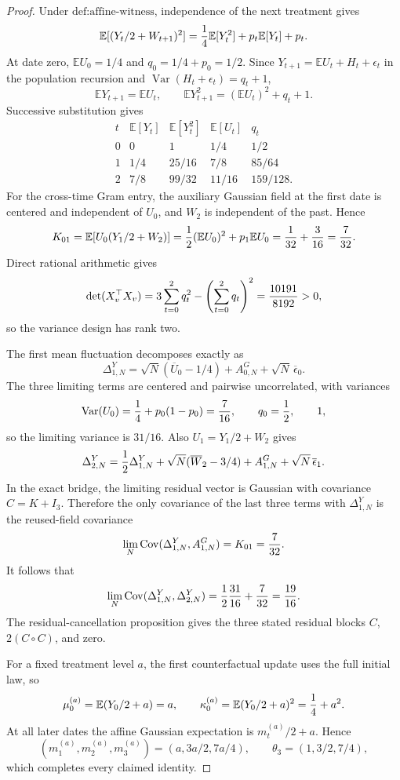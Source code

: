 \documentclass{article}
\begin{document}
\begin{proof}
Under \(\text{def:affine-witness}\), independence of the next treatment gives
\[
 \mathbb E[(Y_t/2+W_{t+1})^2]={1\over4}\mathbb E[Y_t^2]+p_t\mathbb E[Y_t]+p_t.
\]
At date zero, \(\mathbb E U_0=1/4\) and \(q_0=1/4+p_0=1/2\).  Since \(Y_{t+1}=\mathbb E U_t+H_t+\epsilon_t\) in the population recursion and \(\operatorname{Var}(H_t+\epsilon_t)=q_t+1\),
\[
 \mathbb E Y_{t+1}=\mathbb E U_t,
 \qquad \mathbb E Y_{t+1}^2=(\mathbb E U_t)^2+q_t+1.
\]
Successive substitution gives
\[
 \begin{array}{c|c|c|c|c}
 t&\mathbb E[Y_t]&\mathbb E[Y_t^2]&\mathbb E[U_t]&q_t\\\hline
 0&0&1&1/4&1/2\\
 1&1/4&25/16&7/8&85/64\\
 2&7/8&99/32&11/16&159/128.
 \end{array}
\]
For the cross-time Gram entry, the auxiliary Gaussian field at the first date is centered and independent of \(U_0\), and \(W_2\) is independent of the past.  Hence
\[
 K_{01}=\mathbb E[U_0(Y_1/2+W_2)]
 ={1\over2}(\mathbb E U_0)^2+p_1\mathbb E U_0
 ={1\over32}+{3\over16}={7\over32}.
\]
Direct rational arithmetic gives
\[
 \det(X_v^{\top}X_v)=3\sum_{t=0}^2q_t^2-\left(\sum_{t=0}^2q_t\right)^2={10191\over8192}>0,
\]
so the variance design has rank two.

The first mean fluctuation decomposes exactly as
\[
 \Delta_{1,N}^{Y}=\sqrt N(\overline U_0-1/4)+A_{0,N}^{G}+\sqrt N\,\overline\epsilon_0.
\]
The three limiting terms are centered and pairwise uncorrelated, with variances
\[
 \operatorname{Var}(U_0)={1\over4}+p_0(1-p_0)={7\over16},
 \qquad q_0={1\over2},
 \qquad1,
\]
so the limiting variance is \(31/16\).  Also \(U_1=Y_1/2+W_2\) gives
\[
 \Delta_{2,N}^{Y}={1\over2}\Delta_{1,N}^{Y}
 +\sqrt N(\overline W_2-3/4)+A_{1,N}^{G}+\sqrt N\,\overline\epsilon_1.
\]
In the exact bridge, the limiting residual vector is Gaussian with covariance \(C=K+I_3\).  Therefore the only covariance of the last three terms with \(\Delta_{1,N}^{Y}\) is the reused-field covariance
\[
 \lim_N\operatorname{Cov}(\Delta_{1,N}^{Y},A_{1,N}^{G})=K_{01}={7\over32}.
\]
It follows that
\[
 \lim_N\operatorname{Cov}(\Delta_{1,N}^{Y},\Delta_{2,N}^{Y})
 ={1\over2}{31\over16}+{7\over32}={19\over16}.
\]
The residual-cancellation proposition gives the three stated residual blocks \(C\), \(2(C\circ C)\), and zero.

For a fixed treatment level \(a\), the first counterfactual update uses the full initial law, so
\[
 \mu_0^{(a)}=\mathbb E(Y_0/2+a)=a,
 \qquad \kappa_0^{(a)}=\mathbb E(Y_0/2+a)^2={1\over4}+a^2.
\]
At all later dates the affine Gaussian expectation is \(m_t^{(a)}/2+a\).  Hence
\[
 (m_1^{(a)},m_2^{(a)},m_3^{(a)})=(a,3a/2,7a/4),
 \qquad \theta_3=(1,3/2,7/4),
\]
which completes every claimed identity.
\end{proof}
\end{document}
